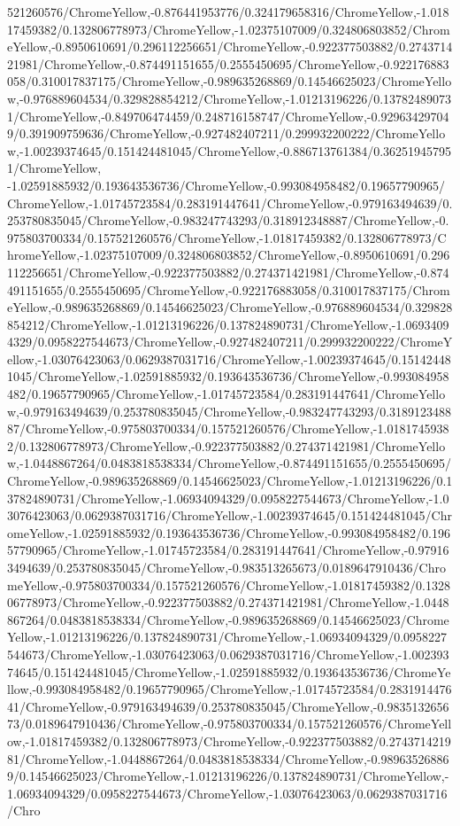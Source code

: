 {\begin{tikzternal}
{521260576/ChromeYellow,-0.876441953776/0.324179658316/ChromeYellow,-1.01817459382/0.132806778973/ChromeYellow,-1.02375107009/0.324806803852/ChromeYellow,-0.8950610691/0.296112256651/ChromeYellow,-0.922377503882/0.274371421981/ChromeYellow,-0.874491151655/0.2555450695/ChromeYellow,-0.922176883058/0.310017837175/ChromeYellow,-0.989635268869/0.14546625023/ChromeYellow,-0.976889604534/0.329828854212/ChromeYellow,-1.01213196226/0.137824890731/ChromeYellow,-0.849706474459/0.248716158747/ChromeYellow,-0.929634297049/0.391909759636/ChromeYellow,-0.927482407211/0.299932200222/ChromeYellow,-1.00239374645/0.151424481045/ChromeYellow,-0.886713761384/0.362519457951/ChromeYellow,
-1.02591885932/0.193643536736/ChromeYellow,-0.993084958482/0.19657790965/ChromeYellow,-1.01745723584/0.283191447641/ChromeYellow,-0.979163494639/0.253780835045/ChromeYellow,-0.983247743293/0.318912348887/ChromeYellow,-0.975803700334/0.157521260576/ChromeYellow,-1.01817459382/0.132806778973/ChromeYellow,-1.02375107009/0.324806803852/ChromeYellow,-0.8950610691/0.296112256651/ChromeYellow,-0.922377503882/0.274371421981/ChromeYellow,-0.874491151655/0.2555450695/ChromeYellow,-0.922176883058/0.310017837175/ChromeYellow,-0.989635268869/0.14546625023/ChromeYellow,-0.976889604534/0.329828854212/ChromeYellow,-1.01213196226/0.137824890731/ChromeYellow,-1.06934094329/0.0958227544673/ChromeYellow,-0.927482407211/0.299932200222/ChromeYellow,-1.03076423063/0.0629387031716/ChromeYellow,-1.00239374645/0.151424481045/ChromeYellow,-1.02591885932/0.193643536736/ChromeYellow,-0.993084958482/0.19657790965/ChromeYellow,-1.01745723584/0.283191447641/ChromeYellow,-0.979163494639/0.253780835045/ChromeYellow,-0.983247743293/0.318912348887/ChromeYellow,-0.975803700334/0.157521260576/ChromeYellow,-1.01817459382/0.132806778973/ChromeYellow,-0.922377503882/0.274371421981/ChromeYellow,-1.0448867264/0.0483818538334/ChromeYellow,-0.874491151655/0.2555450695/ChromeYellow,-0.989635268869/0.14546625023/ChromeYellow,-1.01213196226/0.137824890731/ChromeYellow,-1.06934094329/0.0958227544673/ChromeYellow,-1.03076423063/0.0629387031716/ChromeYellow,-1.00239374645/0.151424481045/ChromeYellow,-1.02591885932/0.193643536736/ChromeYellow,-0.993084958482/0.19657790965/ChromeYellow,-1.01745723584/0.283191447641/ChromeYellow,-0.979163494639/0.253780835045/ChromeYellow,-0.983513265673/0.0189647910436/ChromeYellow,-0.975803700334/0.157521260576/ChromeYellow,-1.01817459382/0.132806778973/ChromeYellow,-0.922377503882/0.274371421981/ChromeYellow,-1.0448867264/0.0483818538334/ChromeYellow,-0.989635268869/0.14546625023/ChromeYellow,-1.01213196226/0.137824890731/ChromeYellow,-1.06934094329/0.0958227544673/ChromeYellow,-1.03076423063/0.0629387031716/ChromeYellow,-1.00239374645/0.151424481045/ChromeYellow,-1.02591885932/0.193643536736/ChromeYellow,-0.993084958482/0.19657790965/ChromeYellow,-1.01745723584/0.283191447641/ChromeYellow,-0.979163494639/0.253780835045/ChromeYellow,-0.983513265673/0.0189647910436/ChromeYellow,-0.975803700334/0.157521260576/ChromeYellow,-1.01817459382/0.132806778973/ChromeYellow,-0.922377503882/0.274371421981/ChromeYellow,-1.0448867264/0.0483818538334/ChromeYellow,-0.989635268869/0.14546625023/ChromeYellow,-1.01213196226/0.137824890731/ChromeYellow,-1.06934094329/0.0958227544673/ChromeYellow,-1.03076423063/0.0629387031716/Chro}
\end{tikzternal}}
